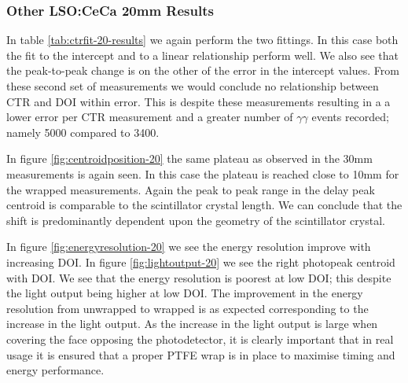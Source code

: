 \subsubsection{Other LSO:CeCa 20mm Results}
In table \ref{tab:ctrfit-20-results} we again perform the two fittings. In this case both the fit to the intercept and to a linear relationship perform well. We also see that the peak-to-peak change is on the other of the error in the intercept values. From these second set of measurements we would conclude no relationship between CTR and DOI within error. This is despite these measurements resulting in a a lower error per CTR measurement and a greater number of $\gamma\gamma$ events recorded; namely 5000 compared to 3400.

In figure \ref{fig:centroidposition-20} the same plateau as observed in the 30mm measurements is again seen. In this case the plateau is reached close to 10mm for the wrapped measurements. Again the peak to peak range in the delay peak centroid is comparable to the scintillator crystal length. We can conclude that the shift is predominantly dependent upon the geometry of the scintillator crystal. 

In figure \ref{fig:energyresolution-20} we see the energy resolution improve with increasing DOI. In figure \ref{fig:lightoutput-20} we see the right photopeak centroid with DOI. We see that the energy resolution is poorest at low DOI; this despite the light output being higher at low DOI. The improvement in the energy resolution from unwrapped to wrapped is as expected corresponding to the increase in the light output. As the increase in the light output is large when covering the face opposing the photodetector, it is clearly important that in real usage it is ensured that a proper PTFE wrap is in place to maximise timing and energy performance.